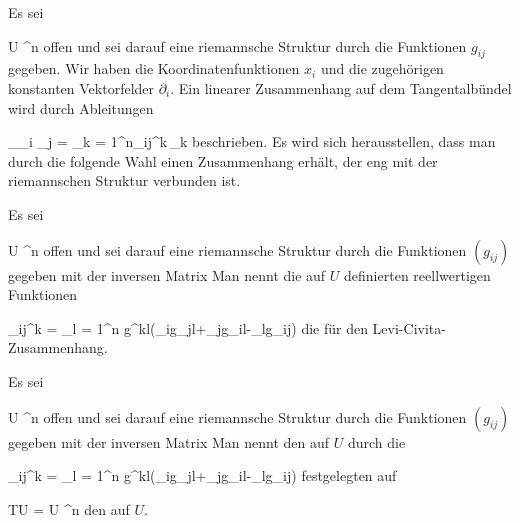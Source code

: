 \setcounter{section}{26}


Es sei

\mavergleichskette
{\vergleichskette
{ U
}
{ \subseteq }{ \R^n
}
{  }{
}
{    }{
}
{   }{
}
}
{}{}{}
offen und sei darauf eine riemannsche Struktur durch die Funktionen $g_{ij}$ gegeben. Wir haben die Koordinatenfunktionen $x_i$ und die zugehörigen konstanten Vektorfelder $\partial_i$. Ein linearer Zusammenhang auf dem Tangentalbündel
 wird durch Ableitungen

\mavergleichskettedisp
{\vergleichskette
{ \nabla_{\partial_i } \partial_j
}
{ =} { \sum_{k = 1}^n\Gamma_{ij}^k\,\partial_k
}
{ } {
}
{ } {
}
{ } {
}
}
{}{}{}
beschrieben. Es wird sich herausstellen, dass man durch die folgende Wahl einen Zusammenhang erhält, der eng mit der riemannschen Struktur verbunden ist.

{}
{

Es sei

\mavergleichskette
{\vergleichskette
{ U
}
{ \subseteq }{ \R^n
}
{  }{
}
{    }{
}
{   }{
}
}
{}{}{}
offen und sei darauf eine riemannsche Struktur durch die Funktionen $\left(  g_{ij}  \right)$ gegeben mit der inversen Matrix
 Man nennt die auf $U$ definierten reellwertigen Funktionen

\mavergleichskettedisp
{\vergleichskette
{ \Gamma_{ij}^k
}
{ =} { {  } \sum_{l = 1}^n g^{kl}(\partial_ig_{jl}+\partial_jg_{il}-\partial_lg_{ij})
}
{ } {
}
{ } {
}
{ } {
}
}
{}{}{}
die
für den Levi-Civita-Zusammenhang.

}

{}
{

Es sei

\mavergleichskette
{\vergleichskette
{ U
}
{ \subseteq }{ \R^n
}
{  }{
}
{    }{
}
{   }{
}
}
{}{}{}
offen und sei darauf eine riemannsche Struktur durch die Funktionen $\left(  g_{ij}  \right)$ gegeben mit der inversen Matrix
 Man nennt den auf $U$ durch die

\mavergleichskettedisp
{\vergleichskette
{ \Gamma_{ij}^k
}
{ =} { {  } \sum_{l = 1}^n g^{kl}(\partial_ig_{jl}+\partial_jg_{il}-\partial_lg_{ij})
}
{ } {
}
{ } {
}
{ } {
}
}
{}{}{}
festgelegten
auf

\mavergleichskette
{\vergleichskette
{ TU
}
{ = }{ U \times \R^n
}
{  }{
}
{    }{
}
{   }{
}
}
{}{}{}
den
auf $U$.

}

